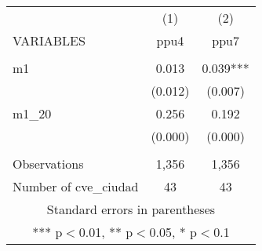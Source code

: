 \begin{tabular}{lcc} \hline
 & (1) & (2) \\
VARIABLES & ppu4 & ppu7 \\ \hline
 &  &  \\
m1 & 0.013 & 0.039*** \\
 & (0.012) & (0.007) \\
m1\_20 & 0.256 & 0.192 \\
 & (0.000) & (0.000) \\
 &  &  \\
Observations & 1,356 & 1,356 \\
 Number of cve\_ciudad & 43 & 43 \\ \hline
\multicolumn{3}{c}{ Standard errors in parentheses} \\
\multicolumn{3}{c}{ *** p$<$0.01, ** p$<$0.05, * p$<$0.1} \\
\end{tabular}
